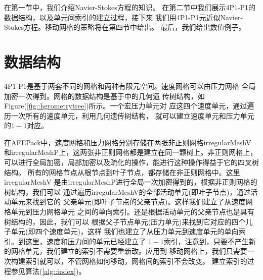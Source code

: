     在第一节中，我们介绍Navier-Stokes方程的知识。
    在第二节中我们展示4P1-P1的数据结构，以及单元间索引的建立过程，接下来
    我们用4P1-P1元近似Navier-Stokes方程。移动网格的策略将在第四节中给出。
    最后，我们给出数值例子。

\section{数据结构}
   4P1-P1是基于两套不同的网格和两种有限元空间。速度网格可以由压力网格
   全局加密一次得到。网格的数据结构是基于\cite{li2005multi}中的几何遗
   传树结构，如Figure(\ref{fig::hgrometrytree})所示。一个宏压力单元对
   应这四个速度单元，通过遍历一次所有的速度单元，利用几何遗传树结构，
   就可以建立速度单元和压力单元的$1-1$对应。

   在AFEPack中，速度网格和压力网格分别存储在两张非正则网格irregularMeshV
   和irregularMeshP上，这两张非正则网格都是建立在同一颗树上。非正则网格上，
   可以进行全局加密，局部加密以及疏化的操作，能进行这种操作得益于它的四叉树结构。
   所有的网格节点从根节点到叶子节点，都存储在非正则网格中。这里irregularMeshV
   是由irregularMeshP进行全局一次加密得到的，根据非正则网格的树结构，我们可以
   通过遍历irregularMeshV的全部活动单元(即叶子节点)，通过活动单元来找到它的
   父亲单元(即叶子节点的父亲节点)。这样我们建立了从速度网格单元到压力网格单元
   之间的单向索引。还是根据活动单元的父亲节点也是具有树结构的，因此，我们可以
   根据父子节点单元(压力单元)来找到它对应的四个儿子单元(即四个速度单元)，这样
   我们也建立了从压力单元到速度单元的单向索引。到这里，速度和压力间的单元已经建立了
   $1-1$索引，注意到，只要不产生新的网格单元，我们建立的索引不需要重新改。应用到
   移动网格上，我们只需要一次构建索引就可以，不管网格如何移动，网格间的索引不会改变。
   建立索引的过程参见算法(\ref{alg::index})。


